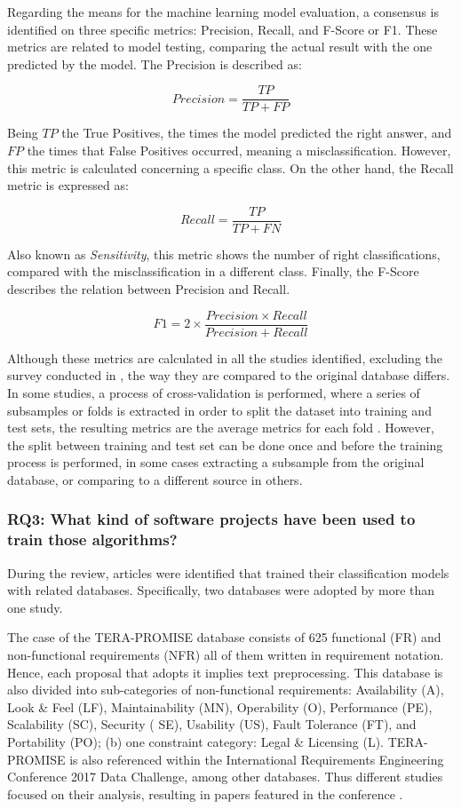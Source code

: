\documentclass[conference]{IEEEtran}
\begin{document}
Regarding the means for the machine learning model evaluation, a consensus is identified on three specific metrics: Precision, Recall, and F-Score or F1. 
These metrics are related to model testing, comparing the actual result with the one predicted by the model. The Precision is described as:

\[ Precision = \frac{TP}{TP + FP} \]

Being $TP$ the True Positives, the times the model predicted the right answer, and $FP$ the times that False Positives occurred, meaning a misclassification. However, this metric is calculated concerning a specific class. On the other hand, the Recall metric is expressed as:

\[ Recall = \frac{TP}{TP + FN} \]

Also known as \textit{Sensitivity}, this metric shows the number of right classifications, compared with the misclassification in a different class. Finally, the F-Score describes the relation between Precision and Recall.

\[ F1 = 2\times\frac{Precision\times Recall}{Precision + Recall} \]

Although these metrics are calculated in all the studies identified, excluding the survey conducted in \cite{8719411}, the way they are compared to the original database differs. In some studies, a process of cross-validation is performed, where a series of subsamples or folds is extracted in order to split the dataset into training and test sets, the resulting metrics are the average metrics for each fold \cite{Mitchell:1997:ML:541177}. However, the split between training and test set can be done once and before the training process is performed, in some cases extracting a subsample from the original database, or comparing to a different source in others.

\subsubsection{RQ3: What kind of software projects have been used to train those algorithms?}

During the review, articles were identified that trained their classification models with related databases. Specifically, two databases were adopted by more than one study.

The case of the TERA-PROMISE database \cite{Sayyad-Shirabad+Menzies:2005} consists of 625 functional (FR) and non-functional requirements (NFR) all of them written in requirement notation. Hence, each proposal that adopts it \cite{8719411,7732349,Taj:2019:ADM:3328833.3328837,8049172,8590177} implies text preprocessing.
This database is also divided into sub-categories of non-functional requirements: Availability (A), Look \& Feel (LF), Maintainability (MN), Operability (O), Performance (PE), Scalability (SC), Security ( SE), Usability (US), Fault Tolerance (FT), and Portability (PO); (b) one constraint category: Legal \& Licensing (L). TERA-PROMISE is also referenced within the International Requirements Engineering Conference 2017 Data Challenge, among other databases. Thus different studies focused on their analysis, resulting in papers featured in the conference \cite{8049170,8049171,8049172,8754214}.
\end{document}
